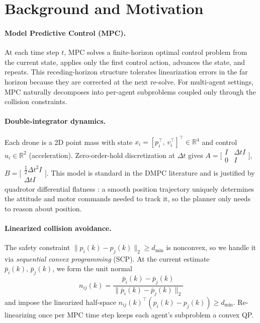 \documentclass[11pt,onecolumn]{article}
\newcommand{\dmin}{d_{\min}}
\newcommand{\Rbb}{\mathbb{R}}
\begin{document}
\section{Background and Motivation}
\label{sec:background}

\paragraph{Model Predictive Control (MPC).}
At each time step $t$, MPC solves a finite-horizon optimal control problem from the current
state, applies only the first control action, advances the state, and repeats.  This
receding-horizon structure tolerates linearization errors in the far horizon because they
are corrected at the next re-solve.  For multi-agent settings, MPC
naturally decomposes into per-agent subproblems coupled only through the collision constraints.

\paragraph{Double-integrator dynamics.}
Each drone is a 2D point mass with state
$x_i = [p_i^\top,\, v_i^\top]^\top \in \Rbb^4$ and control $u_i \in \Rbb^2$
(acceleration).  Zero-order-hold discretization at $\Delta t$ gives
$A = \bigl[\begin{smallmatrix} I & \Delta t I \\ 0 & I \end{smallmatrix}\bigr]$,
$B = \bigl[\begin{smallmatrix} \frac{1}{2}\Delta t^2 I \\ \Delta t I \end{smallmatrix}\bigr]$.
This model is standard in the DMPC literature \cite{luis2020online} and is justified by
quadrotor differential flatness \cite{mellinger2011}: a smooth position trajectory uniquely
determines the attitude and motor commands needed to track it, so the planner only needs
to reason about position.

\paragraph{Linearized collision avoidance.}
The safety constraint $\|p_i(k) - p_j(k)\|_2 \ge \dmin$ is nonconvex, so we handle it
via \emph{sequential convex programming} (SCP). 
At the current estimate $\bar{p}_i(k),\, \bar{p}_j(k)$, we form the unit normal
\[
  n_{ij}(k) = \frac{\bar p_i(k) - \bar p_j(k)}{\|\bar p_i(k) - \bar p_j(k)\|_2}
\]
and impose the linearized half-space $n_{ij}(k)^\top (p_i(k) - p_j(k)) \ge \dmin$.
Re-linearizing once per MPC time step keeps each agent's subproblem a convex QP.
\end{document}
